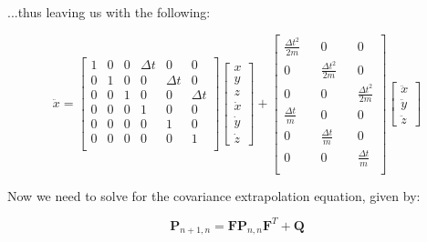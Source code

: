\documentclass{article}
\begin{document}
...thus leaving us with the following:

\begin{equation}
    \textbf{$\ddot{x}$} = \begin{bmatrix}
        1 & 0 & 0 & \Delta t & 0        & 0        \\
        0 & 1 & 0 & 0        & \Delta t & 0        \\
        0 & 0 & 1 & 0        & 0        & \Delta t \\
        0 & 0 & 0 & 1        & 0        & 0        \\
        0 & 0 & 0 & 0        & 1        & 0        \\
        0 & 0 & 0 & 0        & 0        & 1        \\
    \end{bmatrix}
    \begin{bmatrix}
        x       \\ y \\ z \\
        \dot{x} \\ \dot{y} \\ \dot{z}
    \end{bmatrix} +
    \begin{bmatrix}
        \frac{\Delta t^2}{2m} &  & 0                     &  & 0                     \\
        0                     &  & \frac{\Delta t^2}{2m} &  & 0                     \\
        0                     &  & 0                     &  & \frac{\Delta t^2}{2m} \\
        \frac{\Delta t}{m}    &  & 0                     &  & 0                     \\
        0                     &  & \frac{\Delta t}{m}    &  & 0                     \\
        0                     &  & 0                     &  & \frac{\Delta t}{m}    \\
    \end{bmatrix}
    \begin{bmatrix}
        \ddot{x} \\ \ddot{y} \\ \ddot{z}
    \end{bmatrix}
\end{equation}

Now we need to solve for the covariance extrapolation equation, given by:

\begin{equation}
    \textbf{P}_{n+1,n} = \textbf{F} \textbf{P}_{n,n} \textbf{F}^T + \textbf{Q}
\end{equation}
\end{document}
